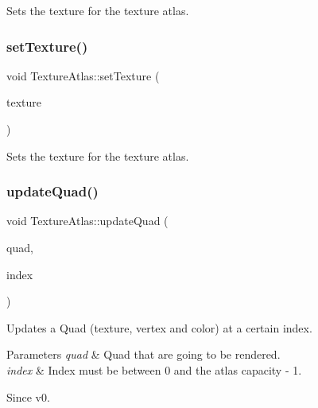 Sets the texture for the texture atlas. \mbox{\label{classTextureAtlas_ab55928f2095021b5f733e92e05496457}} 
\subsubsection{\texorpdfstring{set\+Texture()}{setTexture()}\hspace{0.1cm}{\footnotesize\ttfamily [2/2]}}
{\footnotesize\ttfamily void Texture\+Atlas\+::set\+Texture (\begin{DoxyParamCaption}\item[{\hyperlink{classTexture2D}{Texture2D} $\ast$}]{texture }\end{DoxyParamCaption})}

Sets the texture for the texture atlas. \mbox{\label{classTextureAtlas_a3811e75915851fc5035804f3ecc5423e}} 
\subsubsection{\texorpdfstring{update\+Quad()}{updateQuad()}\hspace{0.1cm}{\footnotesize\ttfamily [1/2]}}
{\footnotesize\ttfamily void Texture\+Atlas\+::update\+Quad (\begin{DoxyParamCaption}\item[{\hyperlink{structV3F__C4B__T2F__Quad}{V3\+F\+\_\+\+C4\+B\+\_\+\+T2\+F\+\_\+\+Quad} $\ast$}]{quad,  }\item[{ssize\+\_\+t}]{index }\end{DoxyParamCaption})}

Updates a Quad (texture, vertex and color) at a certain index. 
\begin{DoxyParams}{Parameters}
{\em quad} & Quad that are going to be rendered. \\
\hline
{\em index} & Index must be between 0 and the atlas capacity -\/ 1. \\
\hline
\end{DoxyParams}
\begin{DoxySince}{Since}
v0. 
\end{DoxySince}
\mbox{\label{classTextureAtlas_a3811e75915851fc5035804f3ecc5423e}} 
